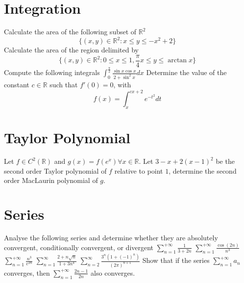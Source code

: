 \documentclass[12pt]{article}
\begin{document}
\section{Integration}
\begin{ExerciseList}
	\Exercise Calculate the area of the following subset of $\mathbb R^2$
	$$\{(x,y)\in\mathbb R^2 \colon x\le y\le -x^2+2\}$$
	\Exercise Calculate the area of the region delimited by
	$$\{ (x,y)\in\mathbb R^2 \colon 0\le x\le 1,\frac{\pi}{4}x\le y\le\arctan x \}$$
	\Exercise Compute the following integrals
	\Question $\int_0^{\frac{\pi}{2}}\frac{\sin x \cos x}{2+\sin^2x}dx$
	\Exercise Determine the value of the constant $c\in\mathbb R$ such that $f'(0) = 0$, with
	$$f(x)=\int_x^{cx+2}{e^{-t^2}}dt$$
\end{ExerciseList}

\section{Taylor Polynomial}
\begin{ExerciseList}
	\Exercise Let $f\in C^2(\mathbb R)$ and $g(x)=f(e^x)\forall x\in\mathbb R$.
	Let $3-x+2(x-1)^2$ be the second order Taylor polynomial of $f$ relative
	to point $1$, determine the second order MacLaurin polynomial of $g$.
\end{ExerciseList}
\section{Series}
\begin{ExerciseList}
	\Exercise Analyse the following series and determine whether they are absolutely convergent, conditionally convergent, or divergent
	\Question $\sum_{n=1}^{+\infty}\frac{1}{3+2n}$
	\Question $\sum_{n=1}^{+\infty}\frac{\cos(2n)}{n^3}$
	\Question $\sum_{n=1}^{+\infty}\frac{n^3}{e^{2n}}$
	\Question $\sum_{n=1}^{\infty}\frac{2+n\sqrt{n}}{1+3n^4}$
	\Question $\sum_{n=2}^{\infty}\frac{3^n(1+(-1)^n)}{(2\pi)^{n+1}}$
	\Exercise Show that if the series $\sum_{n=1}^{+\infty}a_n$ converges, then
	$\sum_{n=1}^{+\infty}\frac{2n-1}{2n}$ also converges.
\end{ExerciseList}
\end{document}
